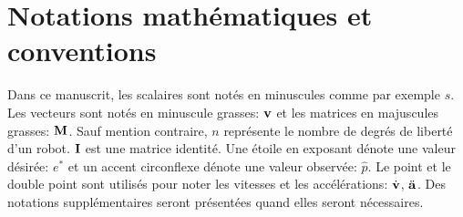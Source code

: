 \FloatBarrier
\newpage
\section*{Notations mathématiques et conventions}
Dans ce manuscrit, les scalaires sont notés en minuscules comme par exemple $s$.
Les vecteurs sont notés en minuscule grasses: ${\mathbf{v}}$ et les matrices en majuscules
grasses: ${\mathbf{M}}$. Sauf mention contraire, $n$ représente le nombre de degrés de liberté d'un 
robot. ${\mathbf{I}}$ est une matrice identité. Une étoile en exposant dénote une
valeur désirée: $e^*$ et un accent circonflexe dénote une valeur observée: $\hat{p}$.
Le point et le double point sont utilisés pour noter les vitesses et les 
accélérations: $\dot{{\mathbf{v}}}$, $\ddot{{\mathbf{a}}}$.
Des notations supplémentaires seront présentées quand elles seront nécessaires.
